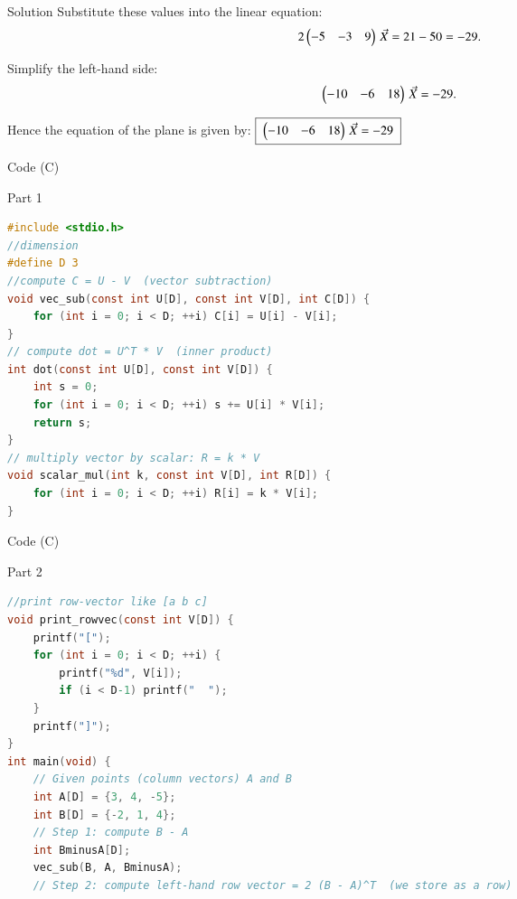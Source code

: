 \documentclass{beamer}
\begin{document}
\begin{frame}{Solution}
Substitute these values into the linear equation:
\begin{align}
2\begin{pmatrix}-5 & -3 & 9\end{pmatrix}\,\Vec{X} &= 21 - 50 = -29.
\end{align}

Simplify the left-hand side:
\begin{align}
\begin{pmatrix}-10 & -6 & 18\end{pmatrix}\,\Vec{X} &= -29.
\end{align}

Hence the equation of the plane is given by:
$\boxed{\;\begin{pmatrix}-10 & -6 & 18\end{pmatrix}\,\Vec{X} = -29\;}$
\end{frame}


\begin{frame}[fragile]{ Code (C)}
\begin{block}{Part 1}
\begin{lstlisting}[language=C, basicstyle=\ttfamily\small, keywordstyle=\color{blue}, frame=single]
#include <stdio.h>
//dimension 
#define D 3
//compute C = U - V  (vector subtraction) 
void vec_sub(const int U[D], const int V[D], int C[D]) {
    for (int i = 0; i < D; ++i) C[i] = U[i] - V[i];
}
// compute dot = U^T * V  (inner product) 
int dot(const int U[D], const int V[D]) {
    int s = 0;
    for (int i = 0; i < D; ++i) s += U[i] * V[i];
    return s;
}
// multiply vector by scalar: R = k * V 
void scalar_mul(int k, const int V[D], int R[D]) {
    for (int i = 0; i < D; ++i) R[i] = k * V[i];
}
\end{lstlisting}
\end{block}
\end{frame}

\begin{frame}[fragile]{ Code (C)}
\begin{block}{Part 2}
\begin{lstlisting}[language=C, basicstyle=\ttfamily\small, keywordstyle=\color{blue}, frame=single]
//print row-vector like [a b c] 
void print_rowvec(const int V[D]) {
    printf("[");
    for (int i = 0; i < D; ++i) {
        printf("%d", V[i]);
        if (i < D-1) printf("  ");
    }
    printf("]");
}
int main(void) {
    // Given points (column vectors) A and B 
    int A[D] = {3, 4, -5};
    int B[D] = {-2, 1, 4};
    // Step 1: compute B - A 
    int BminusA[D];
    vec_sub(B, A, BminusA);
    // Step 2: compute left-hand row vector = 2 (B - A)^T  (we store as a row) 
\end{lstlisting}
\end{block}
\end{frame}
\end{document}
